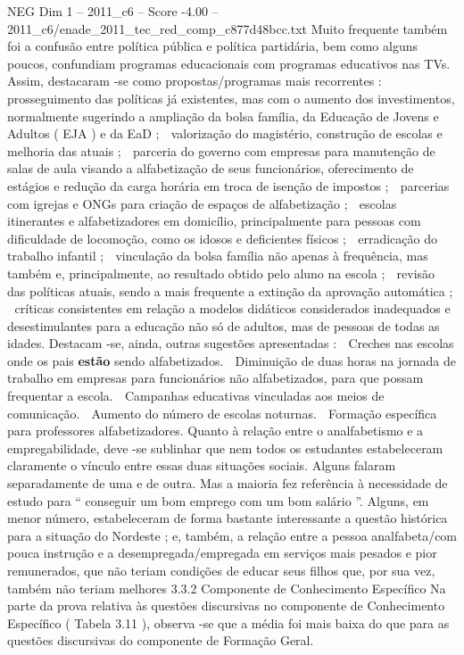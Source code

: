 \begin{textsample}{NEG Dim 1 – 2011\_c6 – Score -4.00 – 2011\_c6/enade\_2011\_tec\_red\_comp\_c877d48bcc.txt}
Muito frequente também foi a confusão entre política pública e política partidária, bem como alguns poucos, confundiam programas educacionais com programas educativos nas TVs.
Assim, destacaram -se como propostas/programas mais recorrentes :  prosseguimento das políticas já existentes, mas com o aumento dos investimentos, normalmente sugerindo a ampliação da bolsa família, da Educação de Jovens e Adultos ( EJA ) e da EaD ;  valorização do magistério, construção de escolas e melhoria das atuais ;  parceria do governo com empresas para manutenção de salas de aula visando a alfabetização de seus funcionários, oferecimento de estágios e redução da carga horária em troca de isenção de impostos ;  parcerias com igrejas e ONGs para criação de espaços de alfabetização ;  escolas itinerantes e alfabetizadores em domicílio, principalmente para pessoas com dificuldade de locomoção, como os idosos e deficientes físicos ;  erradicação do trabalho infantil ;  vinculação da bolsa família não apenas à frequência, mas também e, principalmente, ao resultado obtido pelo aluno na escola ;  revisão das políticas atuais, sendo a mais frequente a extinção da aprovação automática ;  críticas consistentes em relação a modelos didáticos considerados inadequados e desestimulantes para a educação não só de adultos, mas de pessoas de todas as idades.
Destacam -se, ainda, outras sugestões apresentadas :  Creches nas escolas onde os pais \textbf{estão} sendo alfabetizados.  Diminuição de duas horas na jornada de trabalho em empresas para funcionários não alfabetizados, para que possam frequentar a escola.  Campanhas educativas vinculadas aos meios de comunicação.  Aumento do número de escolas noturnas.  Formação específica para professores alfabetizadores.
Quanto à relação entre o analfabetismo e a empregabilidade, deve -se sublinhar que nem todos os estudantes estabeleceram claramente o vínculo entre essas duas situações sociais.
Alguns falaram separadamente de uma e de outra.
Mas a maioria fez referência à necessidade de estudo para “ conseguir um bom emprego com um bom salário ”.
Alguns, em menor número, estabeleceram de forma bastante interessante a questão histórica para a situação do Nordeste ; e, também, a relação entre a pessoa analfabeta/com pouca instrução e a desempregada/empregada em serviços mais pesados e pior remunerados, que não teriam condições de educar seus filhos que, por sua vez, também não teriam melhores 3.3.2 Componente de Conhecimento Específico Na parte da prova relativa às questões discursivas no componente de Conhecimento Específico ( Tabela 3.11 ), observa -se que a média foi mais baixa do que para as questões discursivas do componente de Formação Geral.

\end{textsample}
